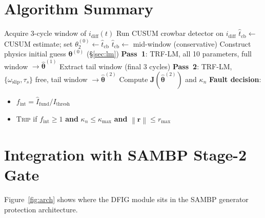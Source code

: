 \documentclass[11pt,a4paper]{article}
\newcommand{\vect}[1]{\boldsymbol{#1}}
\newcommand{\mat}[1]{\mathbf{#1}}
\newcommand{\norm}[1]{\left\|#1\right\|}
\newcommand{\omegas}{\omega_{\text{slip}}}
\newcommand{\taus}{\tau_s}
\begin{document}
\section{Algorithm Summary}
\label{sec:alg}

\begin{algorithm}[H]
\caption{DFIG 87L/87G Protection (TR-56)}
\label{alg:protection}
\begin{algorithmic}[1]
  \State Acquire 3-cycle window of $i_{\text{diff}}(t)$
  \State Run CUSUM crowbar detector on $i_{\text{diff}}$
    \State $\hat{t}_{\text{cb}} \leftarrow$ CUSUM estimate; set
           $\theta_2^{(0)} \leftarrow \hat{t}_{\text{cb}}$
  \Else
    \State $\hat{t}_{\text{cb}} \leftarrow$ mid-window (conservative)
  \EndIf
  \State Construct physics initial guess $\vect{\theta}^{(0)}$
         (§\ref{sec:lm})
  \State \textbf{Pass~1}: TRF-LM, all 10 parameters, full window
         $\rightarrow \hat{\vect{\theta}}^{(1)}$
  \State Extract tail window (final 3 cycles)
  \State \textbf{Pass~2}: TRF-LM, $\{\omegas, \taus\}$ free, tail window
         $\rightarrow \hat{\vect{\theta}}^{(2)}$
  \State Compute $\mat{J}(\hat{\vect{\theta}}^{(2)})$ and $\kappa_n$
  \State \textbf{Fault decision}:
  \begin{itemize}
    \item $f_{\text{int}} = \hat{I}_{\text{fund}} / I_{\text{thresh}}$
    \item \textsc{Trip} if $f_{\text{int}} \geq 1$ \textbf{and}
          $\kappa_n \leq \kappa_{\max}$ \textbf{and}
          $\norm{\vect{r}} \leq r_{\max}$
  \end{itemize}
\end{algorithmic}
\end{algorithm}

\section{Integration with SAMBP Stage-2 Gate}
\label{sec:integration}

Figure~\ref{fig:arch} shows where the DFIG module sits in the SAMBP
generator protection architecture.
\end{document}
